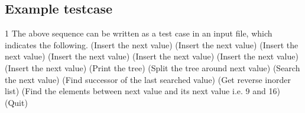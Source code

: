 \documentclass{article}
\begin{document}
\subsection{Example testcase}
1\newline\newline
The above sequence can be written as a test case in an input file, which indicates the following. (Insert the next value) (Insert the next value) (Insert the next value) (Insert the next value) (Insert the next value) (Insert the next value) (Insert the next value) (Print the tree) (Split the tree around next value) (Search the next value) (Find successor of the last searched value) (Get reverse inorder list) (Find the elements between next value and its next value i.e. 9 and 16) (Quit)
\end{document}
